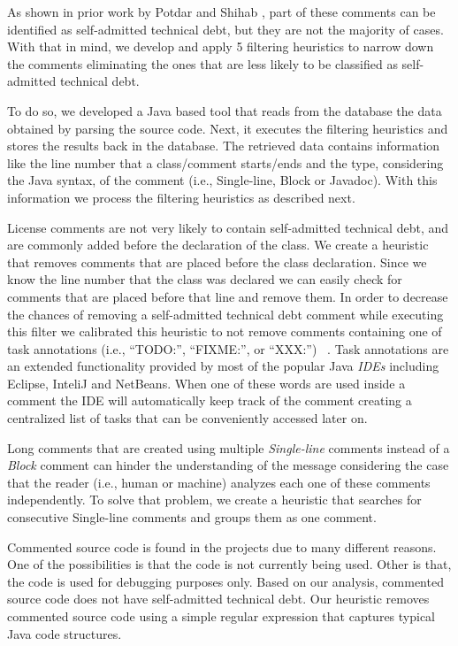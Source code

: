 As shown in prior work by Potdar and Shihab \cite{Potdar2014ICSME}, part of these comments can be identified as self-admitted technical debt, but they are not the majority of cases. With that in mind, we develop and apply 5 filtering heuristics to narrow down the comments eliminating the ones that are less likely to be classified as self-admitted technical debt.

To do so, we developed a Java based tool that reads from the database the data obtained by parsing the source code. Next, it executes the filtering heuristics and stores the results back in the database. The retrieved data contains information like the line number that a class/comment starts/ends and the type, considering the Java syntax, of the comment (i.e., Single-line, Block or Javadoc). With this information we process the filtering heuristics as described next.

License comments are not very likely to contain self-admitted technical debt, and are commonly added before the declaration of the class. We create a heuristic that removes comments that are placed before the class declaration. Since we know the line number that the class was declared we can easily check for comments that are placed before that line and remove them. In order to decrease the chances of removing a self-admitted technical debt comment while executing this filter we calibrated this heuristic to not remove comments containing one of task annotations (i.e., ``TODO:'', ``FIXME:'', or ``XXX:'') ~\cite{Storey2008ICSE}. Task annotations are an extended functionality provided by most of the popular Java \textit{IDEs} including Eclipse, InteliJ and NetBeans. When one of these words are used inside a comment the IDE will automatically keep track of the comment creating a centralized list of tasks that can be conveniently accessed later on.

Long comments that are created using multiple \emph{Single-line} comments instead of a \emph{Block} comment can hinder the understanding of the message considering the case that the reader (i.e., human or machine) analyzes each one of these comments independently. To solve that problem, we create a heuristic that searches for consecutive Single-line comments and groups them as one comment.
 
Commented source code is found in the projects due to many different reasons. One of the possibilities is that the code is not currently being used. Other is that, the code is used for debugging purposes only. Based on our analysis, commented source code does not have self-admitted technical debt. Our heuristic removes commented source code using a simple regular expression that captures typical Java code structures.

